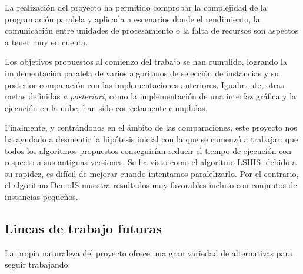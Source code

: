 

La realización del proyecto ha permitido comprobar la complejidad de la programación paralela y aplicada a escenarios donde el rendimiento, la comunicación entre unidades de procesamiento o la falta de recursos son aspectos a tener muy en cuenta.

Los objetivos propuestos al comienzo del trabajo se han cumplido, logrando la implementación paralela de varios algoritmos de selección de instancias y su posterior comparación con las implementaciones anteriores. Igualmente, otras metas definidas \textit{a posteriori}, como la implementación de una interfaz gráfica y la ejecución en la nube, han sido correctamente cumplidas.

Finalmente, y centrándonos en el ámbito de las comparaciones, este proyecto nos ha ayudado a desmentir la hipótesis inicial con la que se comenzó a trabajar: que todos los algoritmos propuestos conseguirían reducir el tiempo de ejecución con respecto a sus antiguas versiones. Se ha visto como el algoritmo LSHIS, debido a su rapidez, es difícil de mejorar cuando intentamos paralelizarlo. Por el contrario, el algoritmo DemoIS muestra resultados muy favorables incluso con conjuntos de instancias pequeños.


\subsection{Lineas de trabajo futuras}
La propia naturaleza del proyecto ofrece una gran variedad de alternativas para seguir trabajando:

